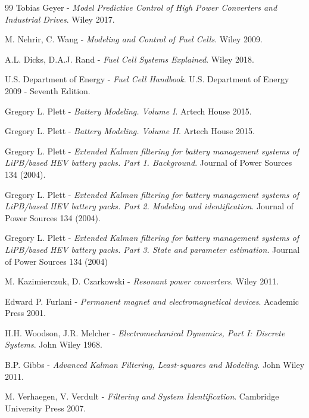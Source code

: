 \documentclass[12pt,a4paper,oneside]{book}
\begin{document}
\begin{onehalfspace}
\begin{thebibliography}{99}
	 Tobias Geyer - \textit{Model Predictive Control of  High Power Converters and Industrial Drives}. Wiley 2017.
		
	 M. Nehrir, C. Wang - \textit{Modeling and Control of Fuel Cells}. Wiley 2009.	

	 A.L. Dicks, D.A.J. Rand - \textit{Fuel Cell Systems Explained}. Wiley 2018.	
	
	 U.S. Department of Energy - \textit{Fuel Cell Handbook}. U.S. Department of Energy 2009 - Seventh Edition.	
	
	 Gregory L. Plett - \textit{Battery Modeling. Volume I}. Artech House 2015.
	
	 Gregory L. Plett - \textit{Battery Modeling. Volume II}. Artech House 2015.
	
	 Gregory L. Plett - \textit{Extended Kalman filtering for battery management systems of LiPB/based HEV battery packs. Part 1. Background}. Journal of Power Sources 134 (2004).
	
	 Gregory L. Plett - \textit{Extended Kalman filtering for battery management systems of LiPB/based HEV battery packs. Part 2. Modeling and identification}. Journal of Power Sources 134 (2004).	
	
	 Gregory L. Plett - \textit{Extended Kalman filtering for battery management systems of LiPB/based HEV battery packs. Part 3. State and parameter estimation}. Journal of Power Sources 134 (2004)
	
	 M. Kazimierczuk, D. Czarkowski - \textit{Resonant power converters}. Wiley 2011.
	
	 Edward P. Furlani - \textit{Permanent magnet and electromagnetical devices}. Academic Press 2001.
	
	 H.H. Woodson, J.R. Melcher - \textit{Electromechanical Dynamics, Part I: Discrete Systems}. John Wiley 1968.

	 B.P. Gibbs - \textit{Advanced Kalman Filtering, Least-squares and Modeling}. John Wiley 2011.	
	
	 M. Verhaegen, V. Verdult - \textit{Filtering and System Identification}. Cambridge University Press 2007.


\end{thebibliography}
\end{onehalfspace}
\end{document}
